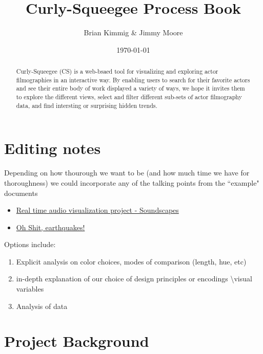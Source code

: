 \documentclass[12pt]{article}
\title{Curly-Squeegee Process Book}
\author{ Brian Kimmig \& Jimmy Moore}
\date{\today}
\begin{document}
\maketitle

\begin{abstract}
	Curly-Squeegee (CS) is a web-bsaed tool for visualizing and exploring actor filmographies in an interactive way. By enabling users to search for their favorite actors and see their entire body of work displayed a variety of ways, we hope it invites them to explore the different views, select and filter different sub-sets of actor filmography data, and find intersting or surprising hidden trends.
\end{abstract}

\tableofcontents

\newpage


\section{Editing notes}

{\color{red}

Depending on how thourough we want to be (and how much time we have for thoroughness) we could incorporate any of the talking points from the ``example" documents
\begin{itemize}
	\item \href{http://dataviscourse.net/2015/assets/process_books/bansal_cao_hou.pdf}{Real time audio visualization project - Soundscapes}
	\item \href{http://dataviscourse.net/2015/assets/process_books/walsh_trevino_bett.pdf}{Oh Shit, earthquakes!}
\end{itemize}

Options include:
\begin{enumerate}
	\item Explicit analysis on color choices, modes of comparison (length, hue, etc)
	\item in-depth explanation of our  choice of design principles or encodings \textbackslash visual variables
	\item Analysis of data
\end{enumerate}
}

\newpage

\section{Project Background}
\end{document}
